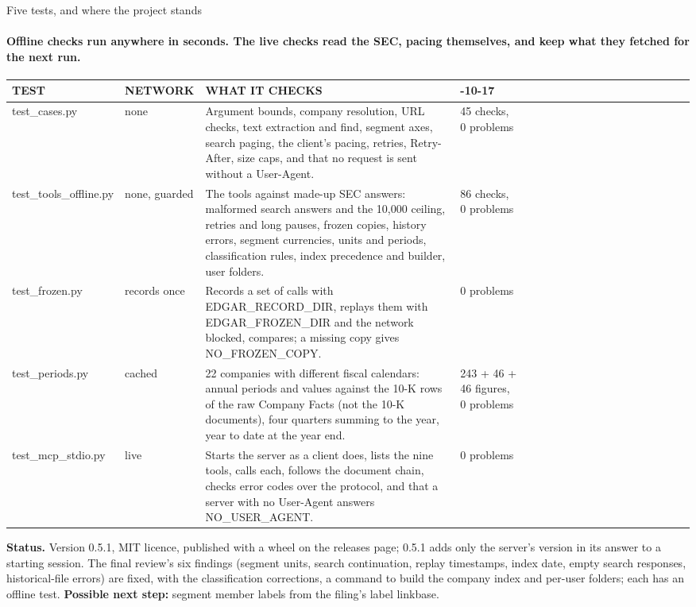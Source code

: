 \documentclass[aspectratio=169,10pt]{beamer}
\newcommand{\kicker}{}
\newcommand{\stcode}{}\newcommand{\stcheck}{}
\newcommand{\status}[2]{\renewcommand{\stcode}{#1}\renewcommand{\stcheck}{#2}}
\newcommand{\cd}[1]{{\ttfamily\fontsize{4.6}{6.15}\selectfont #1}}
\newcommand{\thead}[1]{{\ttfamily\color{muted}\fontsize{5}{6}\selectfont #1}}
\newcommand{\tstart}{\hline\noalign{\vspace{0.8mm}}}
\newcommand{\tmid}{\\[0.4mm]\hline\noalign{\vspace{0.8mm}}}
\newcommand{\tend}{\\[0.4mm]\hline}
\newenvironment{tbl}[1][5.4]{\centering\fontsize{#1}{\numexpr0\relax}\selectfont\fontsize{#1}{1.27\dimexpr#1pt\relax}\selectfont
  \renewcommand{\arraystretch}{1.08}\setlength{\tabcolsep}{1.6mm}}{\par}
\begin{document}
\renewcommand{\kicker}{20 · tests and status}
\status{\cd{tests/}: run each from the repository root, \cd{python -X utf8 tests/<name>.py}; the live ones need \cd{EDGAR\_USER\_AGENT}.}{All five, 0 problems, on 2026-10-17 (Windows 11, CPython 3.13).}
\begin{frame}{Five tests, and where the project stands}
\framesubtitle{Offline checks run anywhere in seconds. The live checks read the SEC, pacing themselves, and keep what they fetched for the next run.}
\begin{tbl}[5.2]
\begin{tabular}{C{22mm}P{13mm}P{68mm}P{27mm}}
\tstart
\thead{TEST} & \thead{NETWORK} & \thead{WHAT IT CHECKS} & \thead{2026-10-17} \tmid
test\_cases.py & none & Argument bounds, company resolution, URL checks, text extraction and \cd{find}, segment axes, search paging, the client's pacing, retries, Retry-After, size caps, and that no request is sent without a User-Agent. & 45 checks, 0 problems \tmid
test\_tools\_offline.py & none, guarded & The tools against made-up SEC answers: malformed search answers and the 10,000 ceiling, retries and long pauses, frozen copies, history errors, segment currencies, units and periods, classification rules, index precedence and builder, user folders. & 86 checks, 0 problems \tmid
test\_frozen.py & records once & Records a set of calls with \cd{EDGAR\_RECORD\_DIR}, replays them with \cd{EDGAR\_FROZEN\_DIR} and the network blocked, compares; a missing copy gives NO\_FROZEN\_COPY. & 0 problems \tmid
test\_periods.py & cached & 22 companies with different fiscal calendars: annual periods and values against the 10-K rows of the raw Company Facts (not the 10-K documents), four quarters summing to the year, year to date at the year end. & 243 + 46 + 46 figures, 0 problems \tmid
test\_mcp\_stdio.py & live & Starts the server as a client does, lists the nine tools, calls each, follows the document chain, checks error codes over the protocol, and that a server with no User-Agent answers NO\_USER\_AGENT. & 0 problems \tend
\end{tabular}
\end{tbl}
\vspace{2mm}
{\fontsize{5.4}{6.8}\selectfont
\textbf{Status.} Version 0.5.1, MIT licence, published with a wheel on the releases page; 0.5.1 adds only the server's version in its answer to a starting session. The final review's six findings (segment units, search continuation, replay timestamps, index date, empty search responses, historical-file errors) are fixed, with the classification corrections, a command to build the company index and per-user folders; each has an offline test. \textbf{Possible next step:} segment member labels from the filing's label linkbase.\par}
\end{frame}
\end{document}
